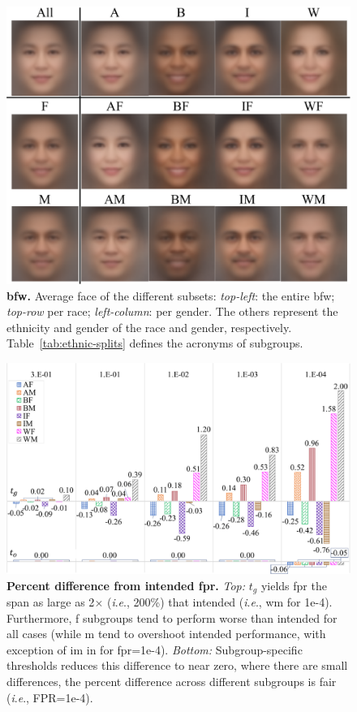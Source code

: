 \documentclass[10pt,twocolumn,letterpaper]{article}
\newcommand{\ie}{\textit{i}.\textit{e}., }
\begin{document}
\begin{figure}[t!]
    \centering
    \includegraphics[width=.8\linewidth]{figures/montage.pdf}
    \caption{\small{\textbf{\gls{bfw}.} Average face of the different subsets: \emph{top-left}: the entire \gls{bfw}; \emph{top-row} per race;  \emph{left-column}: per gender. The others represent the ethnicity and gender of the race and gender, respectively. Table~\ref{tab:ethnic-splits} defines the acronyms of subgroups.}}
    \label{fig:avg-faces}
\end{figure}






\begin{figure}[t!]
       \centering
    \includegraphics[width=.95\linewidth]{figures/fpr_percent_diff-crop.pdf}
    \caption{\small{\textbf{Percent difference from intended \gls{fpr}.} \emph{Top:} $t_g$ yields \gls{fpr} the span as large as 2$\times$ (\ie 200\%) that intended (\ie \gls{wm} for 1e-4). Furthermore, \gls{f} subgroups tend to perform worse than intended for all cases (while \gls{m} tend to overshoot intended performance, with exception of \gls{im} in for \gls{fpr}=1e-4). \emph{Bottom:} Subgroup-specific thresholds reduces this difference to near zero, where there are small differences, the percent difference across different subgroups is fair (\ie FPR=1e-4).}}\label{fig:percent:difference}
\end{figure}
\end{document}
